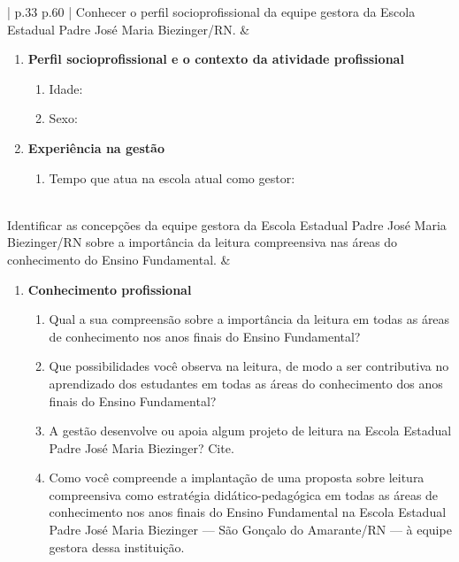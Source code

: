 \begin{refsection}
\begin{longquadro}[t]{ | p{.33\textwidth} p{.60\textwidth} | }
        Conhecer o perfil socioprofissional da equipe gestora da Escola Estadual Padre José Maria Biezinger/RN. &
        \begin{enumerate}[series=questionario,nosep,leftmargin=*,after=\vspace{-\baselineskip},before=\vspace{-\baselineskip},label=\textbf{\Roman*.},widest=III]
            \item \textbf{Perfil socioprofissional e o contexto da atividade profissional}
            \begin{enumerate}[series=questoes,nosep,leftmargin=1.25em,label=\arabic*.,widest=10]
                \item Idade:
                \item Sexo:
            \end{enumerate}
            \item \textbf{Experiência na gestão}
            \begin{enumerate}[resume*=questoes]
                \item Tempo que atua na escola atual como gestor:
            \end{enumerate}
        \end{enumerate} \\
        Identificar as concepções da equipe gestora da Escola Estadual Padre José Maria Biezinger/RN sobre a importância da leitura compreensiva nas áreas do conhecimento do Ensino Fundamental.
        & \begin{enumerate}[resume*=questionario]
            \item \textbf{Conhecimento profissional}
            \begin{enumerate}[resume*=questoes]
                \item Qual a sua compreensão sobre a importância da leitura em todas as áreas de conhecimento nos anos finais do Ensino Fundamental? 
                \item Que possibilidades você observa na leitura, de modo a ser contributiva no aprendizado dos estudantes em todas as áreas do conhecimento dos anos finais do Ensino Fundamental?
                \item A gestão desenvolve ou apoia algum projeto de leitura na Escola Estadual Padre José Maria Biezinger? Cite.
                \item Como você compreende a implantação de uma proposta sobre leitura compreensiva como estratégia didático-pedagógica em todas as áreas de conhecimento nos anos finais do Ensino Fundamental na Escola Estadual Padre José Maria Biezinger --- São Gonçalo do Amarante/RN --- à equipe gestora dessa instituição.

\end{enumerate}
\end{enumerate}
\end{longquadro}
\end{refsection}
